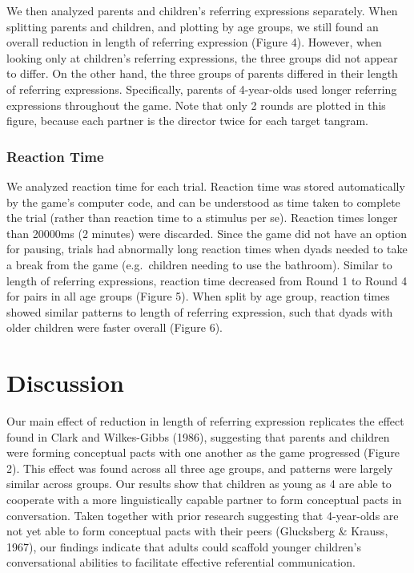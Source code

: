 \documentclass[10pt, letterpaper]{article}
\begin{document}
We then analyzed parents and children's referring expressions
separately. When splitting parents and children, and plotting by age
groups, we still found an overall reduction in length of referring
expression (Figure 4). However, when looking only at children's
referring expressions, the three groups did not appear to differ. On the
other hand, the three groups of parents differed in their length of
referring expressions. Specifically, parents of 4-year-olds used longer
referring expressions throughout the game. Note that only 2 rounds are
plotted in this figure, because each partner is the director twice for
each target tangram.

\hypertarget{reaction-time}{%
\subsubsection{Reaction Time}\label{reaction-time}}

We analyzed reaction time for each trial. Reaction time was stored
automatically by the game's computer code, and can be understood as time
taken to complete the trial (rather than reaction time to a stimulus per
se). Reaction times longer than 20000ms (2 minutes) were discarded.
Since the game did not have an option for pausing, trials had abnormally
long reaction times when dyads needed to take a break from the game
(e.g.~children needing to use the bathroom). Similar to length of
referring expressions, reaction time decreased from Round 1 to Round 4
for pairs in all age groups (Figure 5). When split by age group,
reaction times showed similar patterns to length of referring
expression, such that dyads with older children were faster overall
(Figure 6).

\hypertarget{discussion}{%
\section{Discussion}\label{discussion}}

Our main effect of reduction in length of referring expression
replicates the effect found in Clark and Wilkes-Gibbs (1986), suggesting
that parents and children were forming conceptual pacts with one another
as the game progressed (Figure 2). This effect was found across all
three age groups, and patterns were largely similar across groups. Our
results show that children as young as 4 are able to cooperate with a
more linguistically capable partner to form conceptual pacts in
conversation. Taken together with prior research suggesting that
4-year-olds are not yet able to form conceptual pacts with their peers
(Glucksberg \& Krauss, 1967), our findings indicate that adults could
scaffold younger children's conversational abilities to facilitate
effective referential communication.
\end{document}
